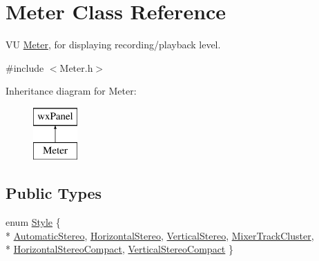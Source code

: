 \hypertarget{class_meter}{}\section{Meter Class Reference}
\label{class_meter}


VU \hyperlink{class_meter}{Meter}, for displaying recording/playback level.  




{\ttfamily \#include $<$Meter.\+h$>$}

Inheritance diagram for Meter\+:\begin{figure}[H]
\begin{center}
\leavevmode
\includegraphics[height=2.000000cm]{class_meter}
\end{center}
\end{figure}
\subsection*{Public Types}
\begin{DoxyCompactItemize}
\item 
enum \hyperlink{class_meter_ad530f6dcdd5d69c0380edc4441bec5a9}{Style} \{ \\*
\hyperlink{class_meter_ad530f6dcdd5d69c0380edc4441bec5a9ae492eaada93dd4e27cdf760b5bc8aeac}{Automatic\+Stereo}, 
\hyperlink{class_meter_ad530f6dcdd5d69c0380edc4441bec5a9a17ea8bf51dd8fb95c0497297d58ed691}{Horizontal\+Stereo}, 
\hyperlink{class_meter_ad530f6dcdd5d69c0380edc4441bec5a9af57ec4e9b105d74e6f5c99c4047a0a7e}{Vertical\+Stereo}, 
\hyperlink{class_meter_ad530f6dcdd5d69c0380edc4441bec5a9a32a97b9333a5c48c9b0a1d923e03c6e6}{Mixer\+Track\+Cluster}, 
\\*
\hyperlink{class_meter_ad530f6dcdd5d69c0380edc4441bec5a9ac3aa3737c2d0abb2d74b2922f91ee19f}{Horizontal\+Stereo\+Compact}, 
\hyperlink{class_meter_ad530f6dcdd5d69c0380edc4441bec5a9a528c3f47ebf9b2e0d781d0ddc271270f}{Vertical\+Stereo\+Compact}
 \}
\end{DoxyCompactItemize}
